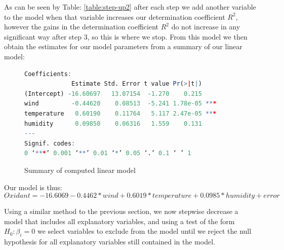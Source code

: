 \documentclass{article}
\begin{document}
    As can be seen by Table: \ref{table:step-up2} after each step we add another variable to the model when that variable increases our determination coefficient $R^2$, however the gains in the determination coefficient $R^2$ do not increase in any significant way after step 3, so this is where we stop. From this model we then obtain the estimates for our model parameters from a summary of our linear model:
	\begin{figure}[H]
	\begin{lstlisting}[language=R]
Coefficients:
             Estimate Std. Error t value Pr(>|t|)    
(Intercept) -16.60697   13.07154  -1.270    0.215    
wind         -0.44620    0.08513  -5.241 1.78e-05 ***
temperature   0.60190    0.11764   5.117 2.47e-05 ***
humidity      0.09850    0.06316   1.559    0.131    
---
Signif. codes:  
0 ‘***’ 0.001 ‘**’ 0.01 ‘*’ 0.05 ‘.’ 0.1 ‘ ’ 1
    \end{lstlisting}
    \caption{Summary of computed linear model}
    \label{table:twotwo}
    \end{figure}
    
    Our model is thus:
    $$Oxidant = -16.6069 -0.4462*wind + 0.6019*temperature + 0.0985*humidity + error$$

    Using a similar method to the previous section, we now stepwise decrease a model that includes all explanatory variables, and using a test of the form $H_0: \beta_i = 0$ we select variables to exclude from the model until we reject the null hypothesis for all explanatory variables still contained in the model.
    
\end{document}
